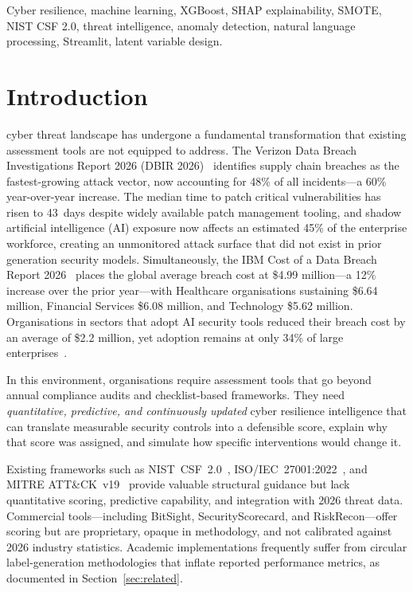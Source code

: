 \documentclass[journal]{IEEEtran}
\begin{document}
\begin{IEEEkeywords}
Cyber resilience, machine learning, XGBoost, SHAP explainability, SMOTE,
NIST CSF 2.0, threat intelligence, anomaly detection, natural language
processing, Streamlit, latent variable design.
\end{IEEEkeywords}

\IEEEpeerreviewmaketitle


\section{Introduction}

 cyber threat landscape has undergone a fundamental
transformation that existing assessment tools are not equipped to address.
The Verizon Data Breach Investigations Report 2026 (DBIR 2026)~\cite{verizon2026}
identifies supply chain breaches as the fastest-growing attack vector,
now accounting for 48\% of all incidents---a 60\% year-over-year increase.
The median time to patch critical vulnerabilities has risen to 43~days
despite widely available patch management tooling, and shadow artificial
intelligence (AI) exposure now affects an estimated 45\% of the enterprise
workforce, creating an unmonitored attack surface that did not exist in prior
generation security models. Simultaneously, the IBM Cost of a Data Breach
Report 2026~\cite{ibm2026} places the global average breach cost at \$4.99
million---a 12\% increase over the prior year---with Healthcare organisations
sustaining \$6.64 million, Financial Services \$6.08 million, and Technology
\$5.62 million. Organisations in sectors that adopt AI security tools reduced
their breach cost by an average of \$2.2 million, yet adoption remains at
only 34\% of large enterprises~\cite{ibm2026}.

In this environment, organisations require assessment tools that go beyond
annual compliance audits and checklist-based frameworks. They need
\emph{quantitative, predictive, and continuously updated} cyber resilience
intelligence that can translate measurable security controls into a defensible
score, explain why that score was assigned, and simulate how specific
interventions would change it.

Existing frameworks such as NIST~CSF~2.0~\cite{nist_csf2},
ISO/IEC~27001:2022~\cite{iso27001}, and MITRE ATT\&CK~v19~\cite{mitre_attack}
provide valuable structural guidance but lack quantitative scoring, predictive
capability, and integration with 2026 threat data. Commercial tools---including
BitSight, SecurityScorecard, and RiskRecon---offer scoring but are proprietary,
opaque in methodology, and not calibrated against 2026 industry statistics.
Academic implementations frequently suffer from circular label-generation
methodologies that inflate reported performance metrics, as documented in
Section~\ref{sec:related}.
\end{document}
